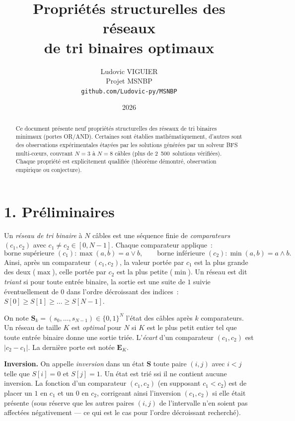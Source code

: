 \documentclass[11pt,a4paper]{article}
\title{\LARGE\bfseries Propriétés structurelles des réseaux\\de tri binaires optimaux}
\author{Ludovic VIGUIER \\ Projet MSNBP \\ \texttt{github.com/Ludovic-py/MSNBP}}
\date{2026}
\theoremstyle{propretheoreme}
\theoremstyle{proprepreuve}
\theoremstyle{proprecorollaire}
\begin{document}
\maketitle
\thispagestyle{empty}

\begin{abstract}
\noindent
Ce document présente neuf propriétés structurelles des réseaux de tri binaires minimaux (portes OR/AND). Certaines sont établies mathématiquement, d'autres sont des observations expérimentales étayées par les solutions générées par un solveur BFS multi-cœurs, couvrant $N=3$ à $N=8$ câbles (plus de 2~500~solutions vérifiées). Chaque propriété est explicitement qualifiée (théorème démontré, observation empirique ou conjecture).
\end{abstract}

\vspace{1cm}

\section*{1. Préliminaires}

Un \emph{réseau de tri binaire} à $N$ câbles est une séquence finie de \emph{comparateurs} $(c_1, c_2)$ avec $c_1 \neq c_2 \in [0, N-1]$. Chaque comparateur applique~:
\[
\text{borne supérieure } (c_1) : \max(a,b) = a \lor b,\qquad
\text{borne inférieure } (c_2) : \min(a,b) = a \land b.
\]
Ainsi, après un comparateur $(c_1,c_2)$, la valeur portée par $c_1$ est la plus grande des deux ($\max$), celle portée par $c_2$ est la plus petite ($\min$). Un réseau est dit \emph{triant} si pour toute entrée binaire, la sortie est une suite de $1$ suivie éventuellement de $0$ dans l'ordre décroissant des indices~: $S[0] \ge S[1] \ge \dots \ge S[N-1]$.

On note $\mathbf{S}_k = (s_0,\ldots,s_{N-1}) \in \{0,1\}^N$ l'état des câbles après $k$ comparateurs. Un réseau de taille $K$ est \emph{optimal} pour $N$ si $K$ est le plus petit entier tel que toute entrée binaire donne une sortie triée. L'\emph{écart} d'un comparateur $(c_1,c_2)$ est $|c_2 - c_1|$. La dernière porte est notée $\mathbf{E}_K$.

\textbf{Inversion.} On appelle \emph{inversion} dans un état $\mathbf{S}$ toute paire $(i,j)$ avec $i<j$ telle que $S[i]=0$ et $S[j]=1$. Un état est trié ssi il ne contient aucune inversion. La fonction d'un comparateur $(c_1,c_2)$ (en supposant $c_1<c_2$) est de placer un $1$ en $c_1$ et un $0$ en $c_2$, corrigeant ainsi l'inversion $(c_1,c_2)$ si elle était présente (sous réserve que les autres paires $(i,j)$ de l'intervalle n'en soient pas affectées négativement — ce qui est le cas pour l'ordre décroissant recherché).
\end{document}
